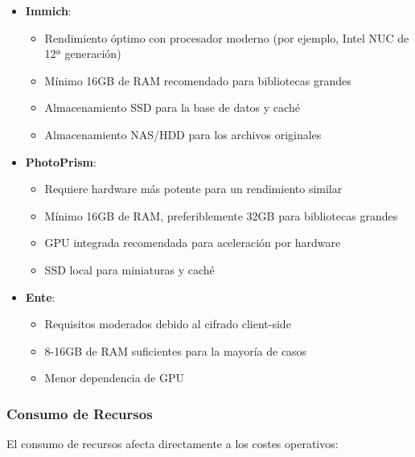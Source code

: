 \begin{itemize}
    \item \textbf{Immich}:
    \begin{itemize}
        \item Rendimiento óptimo con procesador moderno (por ejemplo, Intel NUC de 12ª generación)
        \item Mínimo 16GB de RAM recomendado para bibliotecas grandes
        \item Almacenamiento SSD para la base de datos y caché
        \item Almacenamiento NAS/HDD para los archivos originales
    \end{itemize}
    
    \item \textbf{PhotoPrism}:
    \begin{itemize}
        \item Requiere hardware más potente para un rendimiento similar
        \item Mínimo 16GB de RAM, preferiblemente 32GB para bibliotecas grandes
        \item GPU integrada recomendada para aceleración por hardware
        \item SSD local para miniaturas y caché
    \end{itemize}
    
    \item \textbf{Ente}:
    \begin{itemize}
        \item Requisitos moderados debido al cifrado client-side
        \item 8-16GB de RAM suficientes para la mayoría de casos
        \item Menor dependencia de GPU
    \end{itemize}
\end{itemize}

\subsubsection{Consumo de Recursos}

El consumo de recursos afecta directamente a los costes operativos:

